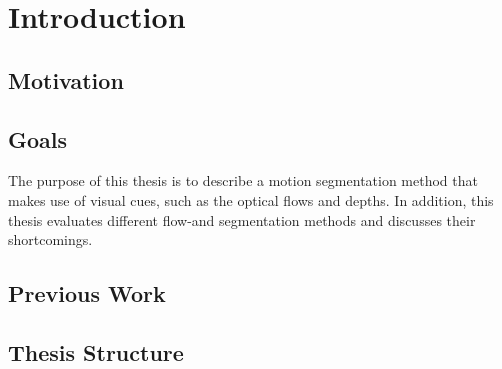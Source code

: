 \chapter{Introduction}
\section{Motivation}
\section{Goals}

The purpose of this thesis is to describe a motion segmentation method that makes use of visual cues, such as the optical flows and depths. In addition, this thesis evaluates different flow-and segmentation methods and discusses their shortcomings.

\section{Previous Work}
\section{Thesis Structure}
